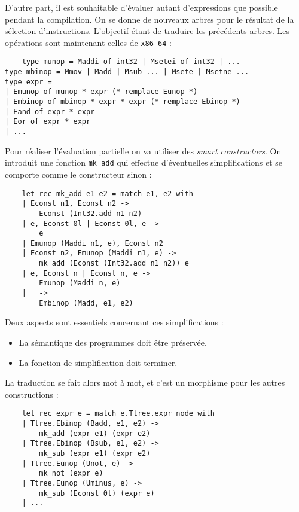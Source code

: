 \documentclass{cours}
\begin{document}
D'autre part, il est souhaitable d'évaluer autant d'expressions que possible pendant la compilation. 
On se donne de nouveaux arbres pour le résultat de la sélection d'instructions. L'objectif étant de traduire les précédents arbres. Les opérations sont maintenant celles de \texttt{x86-64} : 
\begin{verbatim}
    type munop = Maddi of int32 | Msetei of int32 | ...
type mbinop = Mmov | Madd | Msub ... | Msete | Msetne ...
type expr =
| Emunop of munop * expr (* remplace Eunop *)
| Embinop of mbinop * expr * expr (* remplace Ebinop *)
| Eand of expr * expr
| Eor of expr * expr
| ...
\end{verbatim}

Pour réaliser l'évaluation partielle on va utiliser des \textit{smart constructors}. On introduit une fonction \texttt{mk\_add} qui effectue d'éventuelles simplifications et se comporte comme le constructeur sinon : 
\begin{verbatim}
    let rec mk_add e1 e2 = match e1, e2 with
    | Econst n1, Econst n2 ->
        Econst (Int32.add n1 n2)
    | e, Econst 0l | Econst 0l, e ->
        e
    | Emunop (Maddi n1, e), Econst n2
    | Econst n2, Emunop (Maddi n1, e) ->
        mk_add (Econst (Int32.add n1 n2)) e
    | e, Econst n | Econst n, e ->
        Emunop (Maddi n, e)
    | _ ->
        Embinop (Madd, e1, e2)
\end{verbatim}

Deux aspects sont essentiels concernant ces simplifications : 
\begin{itemize}
    \item La sémantique des programmes doit être préservée.
    \item La fonction de simplification doit terminer.
\end{itemize}
La traduction se fait alors mot à mot, et c'est un morphisme pour les autres constructions : 
\begin{verbatim}
    let rec expr e = match e.Ttree.expr_node with
    | Ttree.Ebinop (Badd, e1, e2) ->
        mk_add (expr e1) (expr e2)
    | Ttree.Ebinop (Bsub, e1, e2) ->
        mk_sub (expr e1) (expr e2)
    | Ttree.Eunop (Unot, e) ->
        mk_not (expr e)
    | Ttree.Eunop (Uminus, e) ->
        mk_sub (Econst 0l) (expr e)
    | ...
\end{verbatim}
\end{document}
